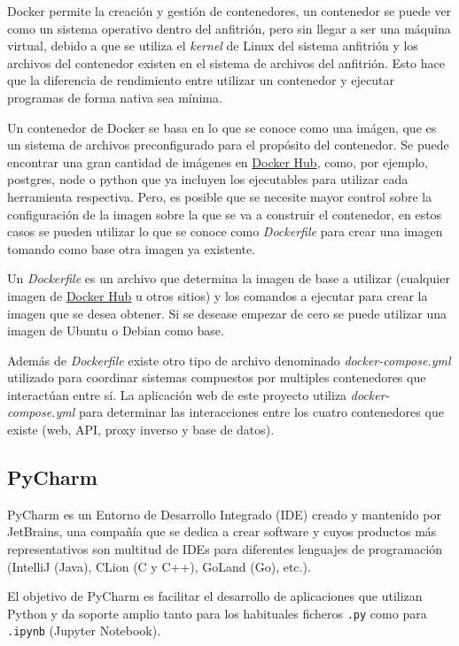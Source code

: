 Docker permite la creación y gestión de contenedores, un contenedor se puede ver
como un sistema operativo dentro del anfitrión, pero sin llegar a ser una
máquina virtual, debido a que se utiliza el \textit{kernel} de Linux del sistema
anfitrión y los archivos del contenedor existen en el sistema de archivos del
anfitrión. Esto hace que la diferencia de rendimiento entre utilizar un
contenedor y ejecutar programas de forma nativa sea mínima.

Un contenedor de Docker se basa en lo que se conoce como una imágen, que es un
sistema de archivos preconfigurado para el propósito del contenedor. Se puede
encontrar una gran cantidad de imágenes en \href{https://hub.docker.com/}{Docker
Hub}, como, por ejemplo, postgres, node o python que ya incluyen los ejecutables
para utilizar cada herramienta respectiva. Pero, es posible que se necesite
mayor control sobre la configuración de la imagen sobre la que se va a construir
el contenedor, en estos casos se pueden utilizar lo que se conoce como
\textit{Dockerfile} para crear una imagen tomando como base otra imagen ya
existente.

Un \textit{Dockerfile} es un archivo que determina la imagen de base a utilizar
(cualquier imagen de \href{https://hub.docker.com/}{Docker Hub} u otros sitios)
y los comandos a ejecutar para crear la imagen que se desea obtener. Si se
desease empezar de cero se puede utilizar una imagen de Ubuntu o Debian como
base.

Además de \textit{Dockerfile} existe otro tipo de archivo denominado
\textit{docker-compose.yml} utilizado para coordinar sistemas compuestos por
multiples contenedores que interactúan entre sí. La aplicación web de este
proyecto utiliza \textit{docker-compose.yml} para determinar las interacciones
entre los cuatro contenedores que existe (web, API, proxy inverso y base de
datos).

\subsection{PyCharm}

PyCharm es un Entorno de Desarrollo Integrado (IDE) creado y mantenido por
JetBrains, una compañía que se dedica a crear software y cuyos productos más
representativos son multitud de IDEs para diferentes lenguajes de programación
(IntelliJ (Java), CLion (C y C++), GoLand (Go), etc.).

El objetivo de PyCharm es facilitar el desarrollo de aplicaciones que utilizan
Python y da soporte amplio tanto para los habituales ficheros \texttt{.py} como
para \texttt{.ipynb} (Jupyter Notebook).

